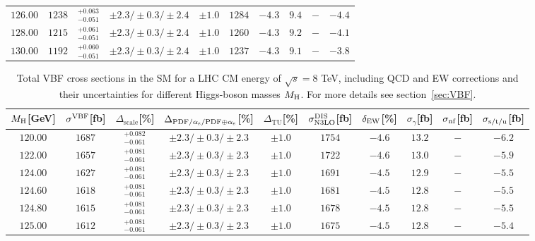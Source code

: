 \begin{table}[ht!]
\begin{center}
\begin{small}
\begin{tabular}{cccccccc|cc}
$126.00$ & $1238$ & $^{+0.063}_{-0.051}$ & $\pm 2.3/\pm 0.3/\pm 2.4$ & $\pm 1.0$ & $1284$ & $-4.3$ & $9.4$ & $-$ & $-4.4$ \\
$128.00$ & $1215$ & $^{+0.061}_{-0.051}$ & $\pm 2.3/\pm 0.3/\pm 2.4$ & $\pm 1.0$ & $1260$ & $-4.3$ & $9.2$ & $-$ & $-4.1$ \\
$130.00$ & $1192$ & $^{+0.060}_{-0.051}$ & $\pm 2.3/\pm 0.3/\pm 2.4$ & $\pm 1.0$ & $1237$ & $-4.3$ & $9.1$ & $-$ & $-3.8$ \\
\bottomrule
\end{tabular}%
\end{small}%
\end{center}%
\end{table}

\begin{table}[ht!]
\caption{Total VBF cross sections in the SM for a LHC CM energy of $\sqrt{s}=8$ TeV, including QCD and EW corrections
and their uncertainties for different Higgs-boson masses $M_\mathrm{H}$. For more details see section~\ref{sec:VBF}.}
\label{tab:vbf_XStot_8}
\begin{center}%
\begin{small}%
\begin{tabular}{cccccccc|cc}%
\toprule
$M_\mathrm{H}$[GeV] & $\sigma^{\mathrm{VBF}}$[fb] & $\Delta_{\mathrm{scale}}$[\%] & $\Delta_{\mathrm{PDF}/\alpha_{\mathrm{s}}/\mathrm{PDF\oplus\alpha_{\mathrm{s}}}}$[\%] & $\Delta_{\mathrm{TU}}$[\%] &
$\sigma_{\mathrm{N3LO}}^{\mathrm{DIS}}$[fb] & $\delta_{\mathrm{EW}}$[\%] & $\sigma_{\gamma}$[fb] & $\sigma_{\mbox{\scriptsize nf}}$[fb] & $\sigma_{\mbox{\scriptsize s/t/u}}$[fb]
\\
\midrule
$120.00$ & $1687$ & $^{+0.082}_{-0.061}$ & $\pm 2.3/\pm 0.3/\pm 2.3$ & $\pm 1.0$ & $1754$ & $-4.6$ & $13.2$ & $-$ & $-6.2$ \\
$122.00$ & $1657$ & $^{+0.081}_{-0.061}$ & $\pm 2.3/\pm 0.3/\pm 2.3$ & $\pm 1.0$ & $1722$ & $-4.6$ & $13.0$ & $-$ & $-5.9$ \\
$124.00$ & $1627$ & $^{+0.081}_{-0.061}$ & $\pm 2.3/\pm 0.3/\pm 2.3$ & $\pm 1.0$ & $1691$ & $-4.5$ & $12.9$ & $-$ & $-5.5$ \\
$124.60$ & $1618$ & $^{+0.081}_{-0.061}$ & $\pm 2.3/\pm 0.3/\pm 2.3$ & $\pm 1.0$ & $1681$ & $-4.5$ & $12.8$ & $-$ & $-5.5$ \\
$124.80$ & $1615$ & $^{+0.081}_{-0.061}$ & $\pm 2.3/\pm 0.3/\pm 2.3$ & $\pm 1.0$ & $1678$ & $-4.5$ & $12.8$ & $-$ & $-5.5$ \\
$125.00$ & $1612$ & $^{+0.081}_{-0.061}$ & $\pm 2.3/\pm 0.3/\pm 2.3$ & $\pm 1.0$ & $1675$ & $-4.5$ & $12.8$ & $-$ & $-5.4$ \\

\end{tabular}
\end{small}
\end{center}
\end{table}
